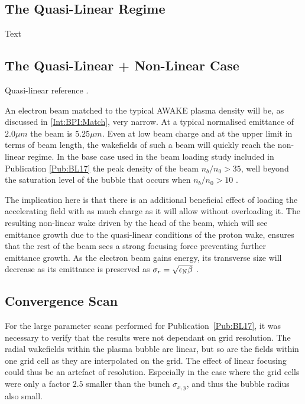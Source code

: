 \subsection{The Quasi-Linear Regime}
\label{SimA:QLin}

Text

\subsection{The Quasi-Linear + Non-Linear Case}
\label{SimA:QLinNonLin}

Quasi-linear reference \cite{rosenzweig:2010}.

An electron beam matched to the typical AWAKE plasma density will be, as discussed in \ref{Int:BPI:Match}, very narrow. At a typical normalised emittance of $2.0\unit{\mu m}$ the beam is $5.25\unit{\mu m}$. Even at low beam charge and at the upper limit in terms of beam length, the wakefields of such a beam will quickly reach the non-linear regime. In the base case used in the beam loading study included in Publication \ref{Pub:BL17} \cite{berglyd_olsen:2018} the peak density of the beam $n_b/n_0 > 35$, well beyond the saturation level of the bubble that occurs when $n_b/n_0 > 10$ \cite{lu:2005}.

The implication here is that there is an additional beneficial effect of loading the accelerating field with as much charge as it will allow without overloading it. The resulting non-linear wake driven by the head of the beam, which will see emittance growth due to the quasi-linear conditions of the proton wake, ensures that the rest of the beam sees a strong focusing force preventing further emittance growth. As the electron beam gains energy, its transverse size will decrease as its emittance is preserved as $\sigma_{r} = \sqrt{\epsilon_{\mathrm{N}}\beta}$ \cite{wille:2001}.

\subsection{Convergence Scan}
\label{SimA:Converge}

For the large parameter scans performed for Publication~\ref{Pub:BL17}, it was necessary to verify that the results were not dependant on grid resolution.
The radial wakefields within the plasma bubble are linear, but so are the fields within one grid cell as they are interpolated on the grid.
The effect of linear focusing could thus be an artefact of resolution.
Especially in the case where the grid cells were only a factor $2.5$ smaller than the bunch $\sigma_{x,y}$, and thus the bubble radius also small.

